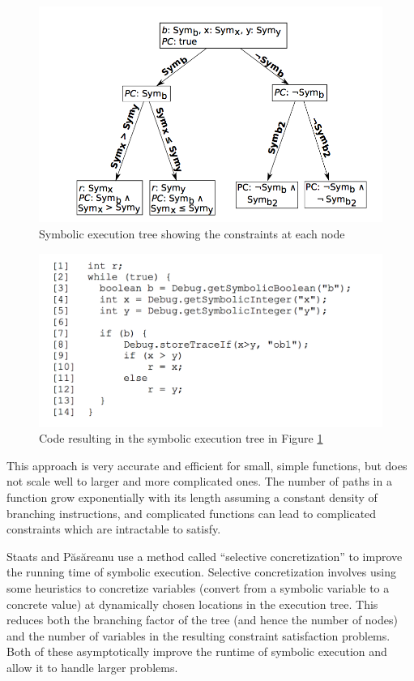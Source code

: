 \documentclass{sig-alternate-05-2015}
\begin{document}
\begin{figure}
\center
\includegraphics[scale=0.3]{se-tree.png}
\caption{Symbolic execution tree showing the constraints at each node}
\label{se-tree}
\end{figure}

\begin{figure}
\center
\includegraphics[scale=0.25]{se-code.png}
\caption{Code resulting in the symbolic execution tree in Figure \ref{se-tree}}
\label{se-code}
\end{figure}

This approach is very accurate and efficient for small, simple functions, but
does not scale well to larger and more complicated ones. The number of paths in
a function grow exponentially with its length assuming a constant density of
branching instructions, and complicated functions can lead to complicated
constraints which are intractable to satisfy.

Staats and P\u{a}s\u{a}reanu \cite{staats} use a method called ``selective
concretization'' to improve the running time of symbolic execution. Selective
concretization involves using some heuristics to concretize variables (convert
from a symbolic variable
to a concrete value) at dynamically chosen locations in the execution tree.
This reduces both the branching factor of the tree (and hence the number of
nodes) and the number of variables in the resulting constraint satisfaction
problems. Both of these asymptotically improve the runtime of symbolic
execution and allow it to handle larger problems.
\end{document}
